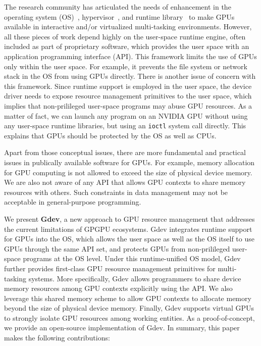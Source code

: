 The research community has articulated the needs of enhancement in 
the operating system (OS)~\cite{Bautin_MCNC08, Kato_ATC11,
Rossbach_SOSP11}, hypervisor~\cite{Gupta_ATC11}, and runtime
library~\cite{Kato_RTSS11} to make GPUs available in interactive
and/or virtualized multi-tasking environments.
However, all these pieces of work depend highly on the user-space runtime
engine, often included as part of proprietary software, which provides
the user space with an application programming interface (API).
This framework limits the use of GPUs only within the user space.
For example, it prevents the file system or network stack in the OS from
using GPUs directly.
There is another issue of concern with this framework.
Since runtime support is employed in the user space, the device
driver needs to expose resource management primitives to the user space,
which implies that non-prilileged user-space programs may abuse GPU
resources.
As a matter of fact, we can launch any program on an NVIDIA GPU without
using any user-space runtime libraries, but using an \texttt{ioctl}
system call directly. 
This explains that GPUs should be protected by the OS as well as CPUs.

Apart from those conceptual issues, there are more fundamental and
practical issues in publically available software for GPUs.
For example, memory allocation for GPU computing is not allowed to
exceed the size of physical device memory.
We are also not aware of any API that allows GPU contexts to share
memory resources with others.
Such constraints in data management may not be acceptable in
general-purpose programming.

We present \textbf{Gdev}, a new approach to GPU resource management that
addresses the current limitations of GPGPU ecosystems.
Gdev integrates runtime support for GPUs into the OS, which allows the
user space as well as the OS itself to use GPUs through the same API
set, and protects GPUs from non-prilileged user-space programs at the OS
level.
Under this runtime-unified OS model, Gdev further provides first-class GPU
resource management primitives for multi-tasking systems.
More specifically, Gdev allows programmers to share device memory
resources among GPU contexts explicitly using the API. 
We also leverage this shared memory scheme to allow GPU contexts to
allocate memory beyond the size of physical device memory.
Finally, Gdev supports virtual GPUs to strongly isolate GPU resources
among working entities.
As a proof-of-concept, we provide an open-source implementation of Gdev.
In summary, this paper makes the following contributions:

